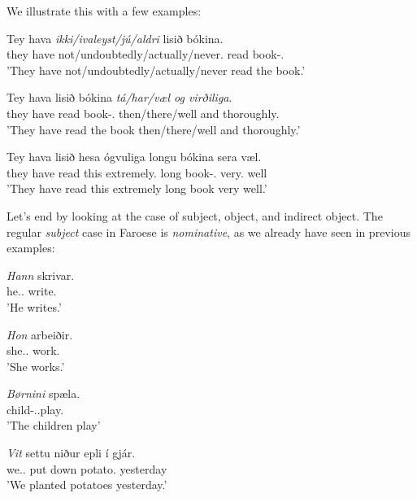 \documentclass[12pt,%
]{lin-v2/lin}
\begin{document}
We illustrate this with a few examples:
\begin{exe}
    \ex
    \begin{xlist}
        \item \gll Tey hava \emph{ikki/ivaleyst/jú/aldri} lisið bókina.\\
        they have not/undoubtedly/actually/never.\Adv{} read book-\Det.\Acc\\
        \trans 'They have not/undoubtedly/actually/never read the book.'
        \item \gll Tey hava lisið bókina \emph{tá/har/væl og virðiliga}.\\
        they have read book-\Det.\Acc{} {then/there/well and thoroughly}.\Adv{}\\
        \trans 'They have read the book then/there/well and thoroughly.'
        \item \gll Tey hava lisið hesa ógvuliga longu bókina sera væl.\\
        they have read this extremely.\Adv{} long book-\Det.\Acc{} very.\Adv{} well\\
        \trans 'They have read this extremely long book very well.'
    \end{xlist}
\end{exe}

Let's end by looking at the case of subject, object, and indirect object. The regular \emph{subject} case in Faroese
is \emph{nominative}, as we already have seen in previous examples:
\begin{exe}
    \ex
    \begin{xlist}
        \item \gll \emph{Hann} skrivar.\\
        he.\Nom.\Sg{} write.\Third\Sg\\
        \trans 'He writes.'
        \item \gll \emph{Hon} arbeiðir.\\
        she.\Nom.\Sg{} work.\Third\Sg\\
        \trans 'She works.'
        \item \gll \emph{Børnini} spæla.\\
        child-\Det.\Nom.\Pl play.\Third\Pl\\
        \trans 'The children play'
        \item \gll \emph{Vit} settu niður epli {í gjár}.\\
        we.\Nom.\Pl{} put down potato.\Pl{} yesterday\\
        \trans 'We planted potatoes yesterday.'
    \end{xlist}
\end{exe}
\end{document}
